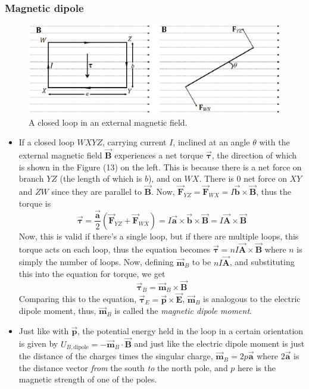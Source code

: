 \documentclass{scrartcl}
\begin{document}
    \subsubsection{Magnetic dipole}
    \begin{figure}[H]
        \centering
        \includegraphics[scale=.9]{magneticdipole.eps}
        \caption{A closed loop in an external magnetic field.}
    \end{figure}
    \begin{itemize}
        \item If a closed loop $WXYZ$, carrying current $I$, inclined at an angle $\theta$ with the external magnetic field $\vec{\mathbf B}$ experiences a net torque $\vec{\mathbf \tau}$, the direction of which is shown in the Figure (13) on the left. This is because there is a net force on branch $YZ$ (the length of which is $b$), and on $WX$. There is 0 net force on $XY$ and $ZW$ since they are parallel to $\vec{\mathbf B}$. Now, $\vec{\mathbf F}_{YZ}=\vec{\mathbf F}_{WX}=I\vec{\mathbf b}\times\vec{\mathbf B}$, thus the torque is \[\vec{\mathbf \tau}=\frac {\vec{\mathbf a}}2\left(\vec{\mathbf F}_{YZ}+\vec{\mathbf F}_{WX}\right)=I\vec{\mathbf a}\times\vec{\mathbf b}\times\vec{\mathbf B}=I\vec{\mathbf A}\times\vec{\mathbf B}\] Now, this is valid if there's a single loop, but if there are multiple loops, this torque acts on each loop, thus the equation becomes $\vec{\mathbf \tau}=nI\vec{\mathbf A}\times\vec{\mathbf B}$ where $n$ is simply the number of loops. Now, defining $\vec{\mathbf m}_B$ to be $nI\vec{\mathbf A}$, and substituting this into the equation for torque, we get \[\boxed{\vec{\mathbf \tau}_B=\vec{\mathbf m}_B\times\vec{\mathbf B}}\] Comparing this to the equation, $\vec{\mathbf \tau}_E=\vec{\mathbf p}\times\vec{\mathbf E}$, $\vec{\mathbf m}_B$ is analogous to the electric dipole moment, thus, $\vec{\mathbf m}_B$ is called the \textit{magnetic dipole moment}.
        \item Just like with $\vec{\mathbf p}$, the potential energy held in the loop in a certain orientation is given by $\boxed{U_{B,\text{dipole}}=-\vec{\mathbf m}_B\cdot\vec{\mathbf B}}$ and just like the electric dipole moment is just the distance of the charges times the singular charge, $\boxed{\vec{\mathbf m}_B=2p\vec{\mathbf a}}$ where $2\vec{\mathbf a}$ is the distance vector \textit{from} the south \textit{to} the north pole, and $p$ here is the magnetic strength of one of the poles.
    \end{itemize}
\end{document}
